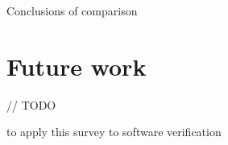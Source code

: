 \documentclass[article]{aaltoseries}
\begin{document}
Conclusions of comparison


\section{Future work}
\label{sec:future_work}
// TODO

to apply this survey to software verification






\end{document}
